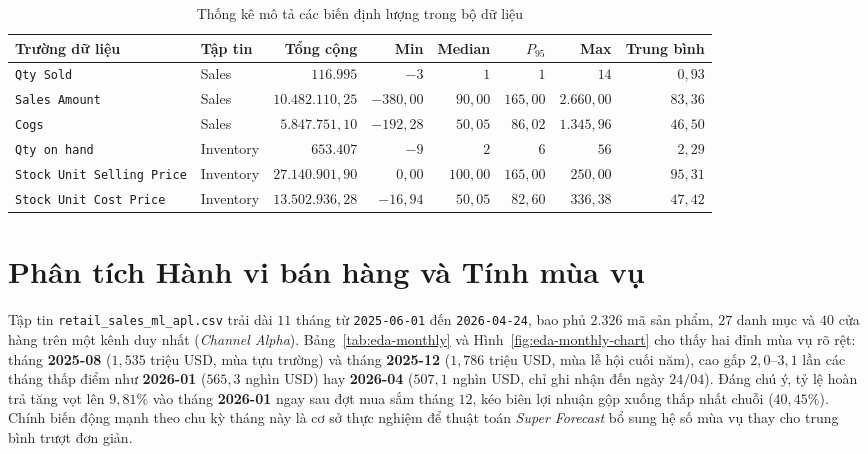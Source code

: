 \begin{table}[H]
	\centering
	\footnotesize
	\setlength{\tabcolsep}{4pt}
	\begin{tabular}{p{4.1cm} l r r r r r r}
		\toprule
		\textbf{Trường dữ liệu}                     & \textbf{Tập tin} & \textbf{Tổng cộng} & \textbf{Min} & \textbf{Median} & \textbf{$P_{95}$} & \textbf{Max} & \textbf{Trung bình} \\
		\midrule
		\texttt{Qty Sold}                 & Sales            & $116.995$          & $-3$         & $1$             & $1$               & $14$         & $0{,}93$            \\
		\texttt{Sales Amount}             & Sales            & $10.482.110{,}25$  & $-380{,}00$  & $90{,}00$       & $165{,}00$        & $2.660{,}00$ & $83{,}36$           \\
		\texttt{Cogs}                     & Sales            & $5.847.751{,}10$   & $-192{,}28$  & $50{,}05$       & $86{,}02$         & $1.345{,}96$ & $46{,}50$           \\
		\texttt{Qty on hand}              & Inventory        & $653.407$          & $-9$         & $2$             & $6$               & $56$         & $2{,}29$            \\
		\texttt{Stock Unit Selling Price} & Inventory        & $27.140.901{,}90$  & $0{,}00$     & $100{,}00$      & $165{,}00$        & $250{,}00$   & $95{,}31$           \\
		\texttt{Stock Unit Cost Price}    & Inventory        & $13.502.936{,}28$  & $-16{,}94$   & $50{,}05$       & $82{,}60$         & $336{,}38$   & $47{,}42$           \\
		\bottomrule
	\end{tabular}
	\caption{Thống kê mô tả các biến định lượng trong bộ dữ liệu}
	\label{tab:eda-numeric-stats}
\end{table}

\section{Phân tích Hành vi bán hàng và Tính mùa vụ}
\label{sec:ch2-sales-eda}
Tập tin \texttt{retail_sales_ml_apl.csv} trải dài $11$ tháng từ \texttt{2025-06-01} đến \texttt{2026-04-24}, bao phủ $2.326$ mã sản phẩm, $27$ danh mục và $40$ cửa hàng trên một kênh duy nhất (\textit{Channel Alpha}). Bảng~\ref{tab:eda-monthly} và Hình~\ref{fig:eda-monthly-chart} cho thấy hai đỉnh mùa vụ rõ rệt: tháng \textbf{2025-08} ($1{,}535$ triệu USD, mùa tựu trường) và tháng \textbf{2025-12} ($1{,}786$ triệu USD, mùa lễ hội cuối năm), cao gấp $2{,}0$--$3{,}1$ lần các tháng thấp điểm như \textbf{2026-01} ($565{,}3$ nghìn USD) hay \textbf{2026-04} ($507{,}1$ nghìn USD, chỉ ghi nhận đến ngày $24/04$). Đáng chú ý, tỷ lệ hoàn trả tăng vọt lên \textbf{$9{,}81\%$} vào tháng \textbf{2026-01} ngay sau đợt mua sắm tháng $12$, kéo biên lợi nhuận gộp xuống thấp nhất chuỗi ($40{,}45\%$). Chính biến động mạnh theo chu kỳ tháng này là cơ sở thực nghiệm để thuật toán \textit{Super Forecast} bổ sung hệ số mùa vụ thay cho trung bình trượt đơn giản.

